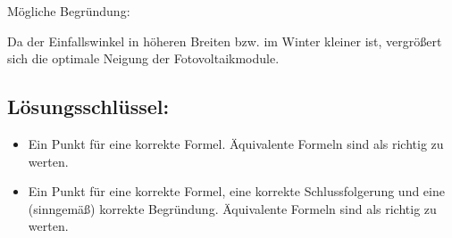 \begin{langesbeispiel}
{\begin{enumerate}
Mögliche Begründung:

Da der Einfallswinkel in höheren Breiten bzw. im Winter kleiner ist, vergrößert sich die optimale Neigung der Fotovoltaikmodule.
	
	\subsection{Lösungsschlüssel:}
	
\begin{itemize}
	\item Ein Punkt für eine korrekte Formel. Äquivalente Formeln sind als richtig zu werten.
	\item Ein Punkt für eine korrekte Formel, eine korrekte Schlussfolgerung und eine (sinngemäß) korrekte Begründung. Äquivalente Formeln sind als richtig zu werten.
\end{itemize}

\end{enumerate}}
		\end{langesbeispiel}